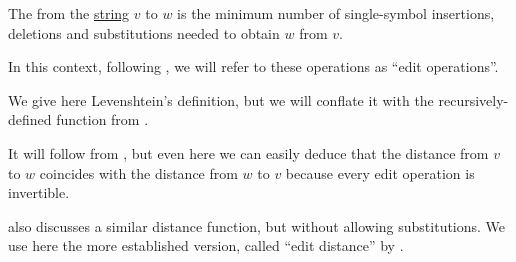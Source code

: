 \begin{definition}\label{def:levenshtein_distance}
  The  from the \hyperref[def:formal_language/string]{string} \( v \) to \( w \) is the minimum number of single-symbol insertions, deletions and substitutions needed to obtain \( w \) from \( v \).

  In this context, following , we will refer to these operations as \enquote{edit operations}.
\end{definition}
\begin{comments}
  \item We give here Levenshtein's definition, but we will conflate it with the recursively-defined function from .

  \item It will follow from , but even here we can easily deduce that the distance from \( v \) to \( w \) coincides with the distance from \( w \) to \( v \) because every edit operation is invertible.

  \item {} also discusses a similar distance function, but without allowing substitutions. We use here the more established version, called \enquote{edit distance} by .
\end{comments}

